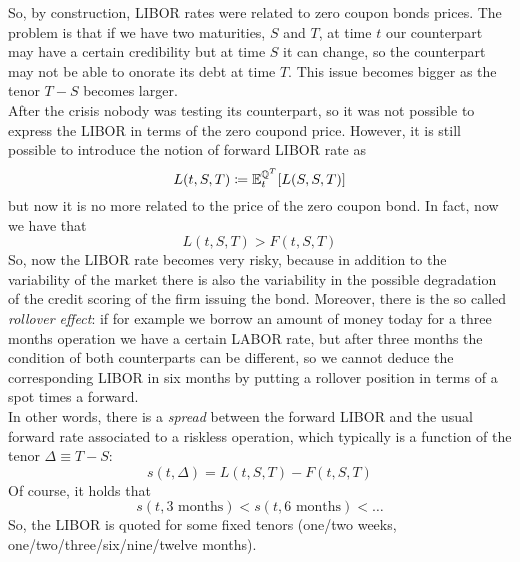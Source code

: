 So, by construction, LIBOR rates were related to zero coupon bonds prices. The problem is that if we have two maturities, $S$ and $T$, at time $t$ our counterpart may have a certain credibility but at time $S$ it can change, so the counterpart may not be able to onorate its debt at time $T$. This issue becomes bigger as the tenor $T-S$ becomes larger. \\
After the crisis nobody was testing its counterpart, so it was not possible to express the LIBOR in terms of the zero coupond price. However, it is still possible to introduce the notion of forward LIBOR rate as
\begin{equation*}
    L(t,S,T) \coloneqq \mathbb{E}^{\mathbb{Q}^T}_t[L(S,S,T)]
\end{equation*}
but now it is no more related to the price of the zero coupon bond. In fact, now we have that
\begin{equation*}
    L(t,S,T) > F(t,S,T)
\end{equation*} %
So, now the LIBOR rate becomes very risky, because in addition to the variability of the market there is also the variability in the possible degradation of the credit scoring of the firm issuing the bond. Moreover, there is the so called \emph{rollover effect}: if for example we borrow an amount of money today for a three months operation we have a certain LABOR rate, but after three months the condition of both counterparts can be different, so we cannot deduce the corresponding LIBOR in six months by putting a rollover position in terms of a spot times a forward. \\ %
In other words, there is a \emph{spread} between the forward LIBOR and the usual forward rate associated to a riskless operation, which typically is a function of the tenor $\Delta\equiv T-S$:
\begin{equation}
    s(t,\Delta) = L(t,S,T) - F(t,S,T)
\end{equation}
Of course, it holds that
\begin{equation*}
    s(t, \text{3 months}) < s(t, \text{6 months}) < \dots
\end{equation*}
So, the LIBOR is quoted for some fixed tenors (one/two weeks, one/two/three/six/nine/twelve months). \\
